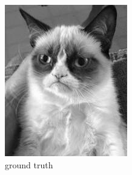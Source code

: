 \documentclass{paper}
\begin{document}
\begin{figure}[ht]
\centering
\begin{subfigure}[h]{0.45\textwidth}
	\centering
	\includegraphics[width=\textwidth]{cat-groundtruth}
	\caption*{ground truth}
\end{subfigure}
~
\begin{subfigure}[h]{0.45\textwidth}
	\centering

\end{subfigure}
\end{figure}
\end{document}
